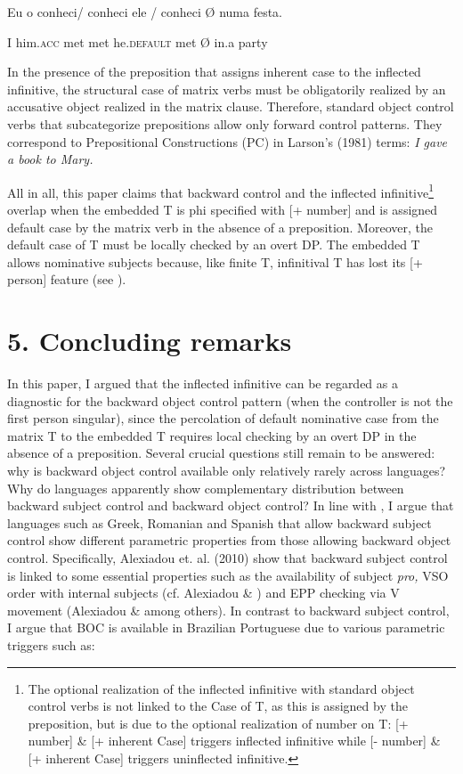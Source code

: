 \documentclass[output=paper]{langsci/langscibook}
\begin{document}
          Eu  o       conheci/ conheci ele        / conheci Ø numa festa. 

I     him.\textsc{acc} met         met       he.\textsc{default}     met       Ø in.a    party

\citep[328]{Farrell1990}

In the presence of the preposition that assigns inherent case to the inflected infinitive, the structural case of matrix verbs must be obligatorily realized by an accusative object realized in the matrix clause. Therefore, standard object control verbs that subcategorize prepositions allow only forward control patterns. They correspond to Prepositional Constructions (PC) in Larson’s (1981) terms: \textit{I gave a book to Mary.}

All in all, this paper claims that backward control and the inflected infinitive\footnote{The optional realization of the inflected infinitive with standard object control verbs is not linked to the Case of T, as this is assigned by the preposition, but is due to the optional realization of number on T: [+ number] \& [+ inherent Case]  triggers inflected infinitive while [- number] \& [+ inherent Case] triggers uninflected infinitive.} overlap when the embedded T is phi specified with [+ number] and is assigned default case by the matrix verb in the absence of a preposition. Moreover, the default case of T must be locally checked by an overt DP. The embedded T allows nominative subjects because, like finite T, infinitival T has lost its [+ person] feature (see \citealt{Cyrino2010}).

\section{ 5. Concluding remarks}

In this paper, I argued that the inflected infinitive can be regarded as a diagnostic for the backward object control pattern (when the controller is not the first person singular), since the percolation of default nominative case from the matrix T to the embedded T requires local checking by an overt DP in the absence of a preposition. Several crucial questions still remain to be answered: why is backward object control available only relatively rarely across languages? Why do languages apparently show complementary distribution between backward subject control and backward object control? In line with \citet{AlexiadouEtAl2010}, I argue that languages such as Greek, Romanian and Spanish that allow backward subject control show different parametric properties from those allowing backward object control. Specifically, Alexiadou et. al. (2010) show that backward subject control is linked to some essential properties such as the availability of subject \textit{pro,} VSO order with internal subjects (cf. Alexiadou \& \citealt{Anagnostopoulou2001}) and EPP checking via V movement (Alexiadou \& \citealt{Anagnostopoulou1998} among others). In contrast to backward subject control, I argue that BOC is available in Brazilian Portuguese due to various parametric triggers such as:
\end{document}
